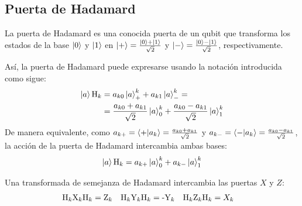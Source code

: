 \subsection{Puerta de Hadamard}
La puerta de Hadamard es una conocida puerta de un qubit que transforma los estados de la base $\ket{0}$ y $\ket{1}$ en $\ket{+}=\frac{\ket{0}+\ket{1}}{\sqrt{2}}$ y $\ket{-}=\frac{\ket{0}-\ket{1}}{\sqrt{2}}$, respectivamente.

Así, la puerta de Hadamard puede expresarse usando la notación introducida como sigue:
\begin{equation}
    \label{eq:hadamard}
    \begin{split}
        \ket{a}\text{H}_k&=a_{k0}\ket{a}^{k}_{+}+a_{k1}\ket{a}^{k}_{-}=\\
        &=\frac{a_{k0}+a_{k1}}{\sqrt{2}}\ket{a}^{k}_{0}+\frac{a_{k0}-a_{k1}}{\sqrt{2}}\ket{a}^{k}_{1}
    \end{split}
\end{equation}
De manera equivalente, como $a_{k+}=\braket{+}{a_k}=\frac{a_{k0}+a_{k1}}{\sqrt{2}}$
y $a_{k-}=\braket{-}{a_k}=\frac{a_{k0}-a_{k1}}{\sqrt{2}}$, la acción de
la puerta de Hadamard intercambia ambas bases:
\begin{equation*}
    \ket{a}\text{H}_k=a_{k+}\ket{a}^{k}_{0}+a_{k-}\ket{a}^{k}_{1}
\end{equation*}

Una transformada de semejanza de Hadamard intercambia las puertas $X$ y $Z$:
\begin{align}
    \text{H}_k\text{X}_k\text{H}_k &= \text{Z}_k & \text{H}_k\text{Y}_k\text{H}_k &= \text{-Y}_k & \text{H}_k\text{Z}_k\text{H}_k &= X_k
\end{align}

